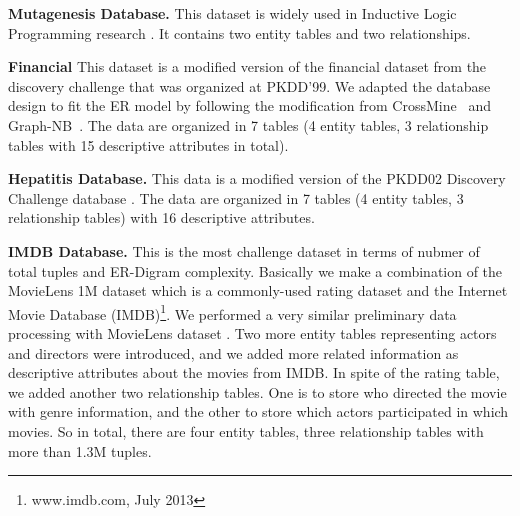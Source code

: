 \documentclass{vldb}
\begin{document}
\noindent\textbf{Mutagenesis Database.}  This dataset is widely used in Inductive Logic Programming research \cite{Srinivasan1996}. %
It contains two entity tables and two relationships.

\noindent\textbf{Financial} 
This dataset is a modified version of the financial dataset from the discovery challenge that was organized at PKDD'99. We adapted the database design to fit the ER model by following the modification from CrossMine~\cite{Yin2004} and Graph-NB~\cite{han2009}. The data are organized in 7 tables (4 entity tables, 3 relationship tables with 15 descriptive attributes in total).

\noindent\textbf{Hepatitis Database.} This data is a modified version of the PKDD02 Discovery Challenge database \cite{Frank2007}. %
The data are organized in 7 tables (4 entity tables,  3 relationship tables) with 16 descriptive attributes. 

\noindent\textbf{IMDB Database.} %
This is the most challenge dataset in terms of nubmer of total tuples and ER-Digram complexity. %
Basically we make a combination of the MovieLens 1M dataset which is a commonly-used rating dataset and the Internet Movie Database (IMDB)\footnote{www.imdb.com, July 2013}.
We performed a very  similar preliminary data processing with MovieLens dataset \cite{Peralta2007}.
Two more entity tables representing actors and directors were introduced, and we added more related information as descriptive attributes about the movies from IMDB. 
In spite of the rating table, we added another two relationship tables. One is to store who directed the movie with genre information, and the other to store which actors participated in which movies.
So in total, there are four entity tables, three relationship tables with more than 1.3M tuples.
\end{document}
